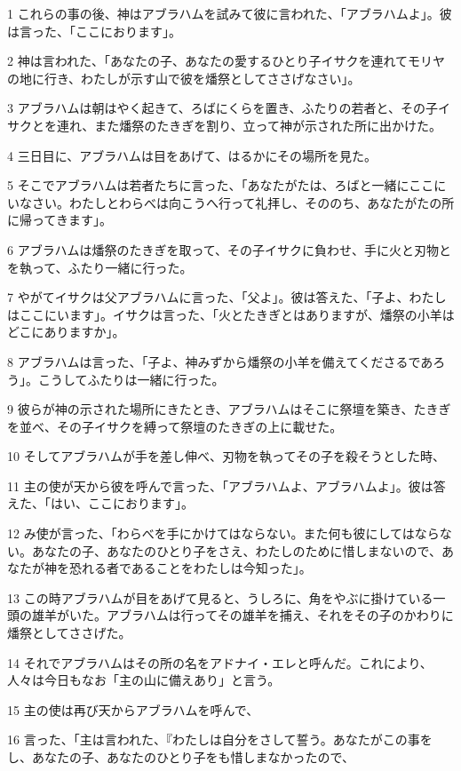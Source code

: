 \par 1 これらの事の後、神はアブラハムを試みて彼に言われた、「アブラハムよ」。彼は言った、「ここにおります」。
\par 2 神は言われた、「あなたの子、あなたの愛するひとり子イサクを連れてモリヤの地に行き、わたしが示す山で彼を燔祭としてささげなさい」。
\par 3 アブラハムは朝はやく起きて、ろばにくらを置き、ふたりの若者と、その子イサクとを連れ、また燔祭のたきぎを割り、立って神が示された所に出かけた。
\par 4 三日目に、アブラハムは目をあげて、はるかにその場所を見た。
\par 5 そこでアブラハムは若者たちに言った、「あなたがたは、ろばと一緒にここにいなさい。わたしとわらべは向こうへ行って礼拝し、そののち、あなたがたの所に帰ってきます」。
\par 6 アブラハムは燔祭のたきぎを取って、その子イサクに負わせ、手に火と刃物とを執って、ふたり一緒に行った。
\par 7 やがてイサクは父アブラハムに言った、「父よ」。彼は答えた、「子よ、わたしはここにいます」。イサクは言った、「火とたきぎとはありますが、燔祭の小羊はどこにありますか」。
\par 8 アブラハムは言った、「子よ、神みずから燔祭の小羊を備えてくださるであろう」。こうしてふたりは一緒に行った。
\par 9 彼らが神の示された場所にきたとき、アブラハムはそこに祭壇を築き、たきぎを並べ、その子イサクを縛って祭壇のたきぎの上に載せた。
\par 10 そしてアブラハムが手を差し伸べ、刃物を執ってその子を殺そうとした時、
\par 11 主の使が天から彼を呼んで言った、「アブラハムよ、アブラハムよ」。彼は答えた、「はい、ここにおります」。
\par 12 み使が言った、「わらべを手にかけてはならない。また何も彼にしてはならない。あなたの子、あなたのひとり子をさえ、わたしのために惜しまないので、あなたが神を恐れる者であることをわたしは今知った」。
\par 13 この時アブラハムが目をあげて見ると、うしろに、角をやぶに掛けている一頭の雄羊がいた。アブラハムは行ってその雄羊を捕え、それをその子のかわりに燔祭としてささげた。
\par 14 それでアブラハムはその所の名をアドナイ・エレと呼んだ。これにより、人々は今日もなお「主の山に備えあり」と言う。
\par 15 主の使は再び天からアブラハムを呼んで、
\par 16 言った、「主は言われた、『わたしは自分をさして誓う。あなたがこの事をし、あなたの子、あなたのひとり子をも惜しまなかったので、
